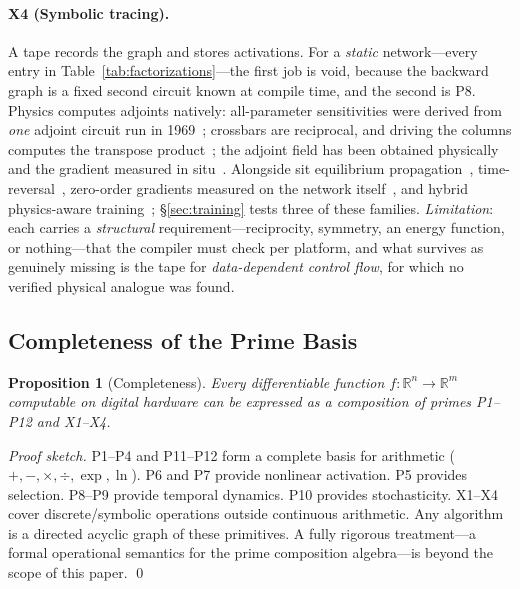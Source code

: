 \documentclass[11pt]{article}
\newtheorem{proposition}{Proposition}
\begin{document}
\paragraph{X4 (Symbolic tracing).} A tape records the graph and stores activations. For a \textit{static} network---every entry in Table~\ref{tab:factorizations}---the first job is void, because the backward graph is a fixed second circuit known at compile time, and the second is P8. Physics computes adjoints natively: all-parameter sensitivities were derived from \textit{one} adjoint circuit run in 1969~\cite{director1969}; crossbars are reciprocal, and driving the columns computes the transpose product~\cite{gokmen2016}; the adjoint field has been obtained physically and the gradient measured in situ~\cite{hughes2018}. Alongside sit equilibrium propagation~\cite{scellier2017,dillavou2022,laydevant2024}, time-reversal~\cite{lopezpastor2023}, zero-order gradients measured on the network itself~\cite{cauwenberghs1996,baydin2022}, and hybrid physics-aware training~\cite{wright2022}; \S\ref{sec:training} tests three of these families. \textit{Limitation}: each carries a \textit{structural} requirement---reciprocity, symmetry, an energy function, or nothing---that the compiler must check per platform, and what survives as genuinely missing is the tape for \textit{data-dependent control flow}, for which no verified physical analogue was found.

\subsection{Completeness of the Prime Basis}
\label{sec:completeness}

\begin{proposition}[Completeness]
Every differentiable function $f: \mathbb{R}^n \to \mathbb{R}^m$ computable on digital hardware can be expressed as a composition of primes P1--P12 and X1--X4.
\end{proposition}

\begin{proof}[Proof sketch]
P1--P4 and P11--P12 form a complete basis for arithmetic ($+, -, \times, \div, \exp, \ln$). P6 and P7 provide nonlinear activation. P5 provides selection. P8--P9 provide temporal dynamics. P10 provides stochasticity. X1--X4 cover discrete/symbolic operations outside continuous arithmetic. Any algorithm is a directed acyclic graph of these primitives. A fully rigorous treatment---a formal operational semantics for the prime composition algebra---is beyond the scope of this paper. \qed
\end{proof}
\end{document}
